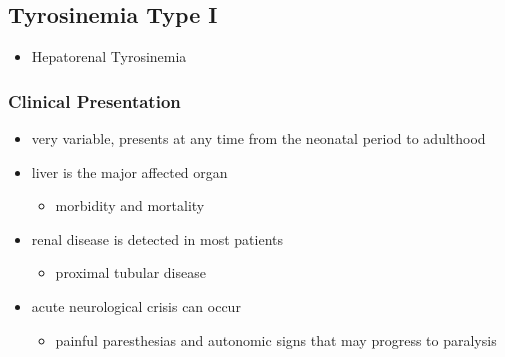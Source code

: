 \documentclass{scrartcl}
\begin{document}
\subsection{Tyrosinemia Type I}
\label{sec:org34dd25d}
\begin{itemize}
\item Hepatorenal Tyrosinemia
\end{itemize}
\subsubsection{Clinical Presentation}
\label{sec:org9fab2a2}
\begin{itemize}
\item very variable, presents at any time from the neonatal period to adulthood

\item liver is the major affected organ
\begin{itemize}
\item morbidity and mortality
\end{itemize}
\item renal disease is detected in most patients
\begin{itemize}
\item proximal tubular disease
\end{itemize}
\item acute neurological crisis can occur
\begin{itemize}
\item painful paresthesias and autonomic signs that may progress to
paralysis
\end{itemize}
\end{itemize}
\end{document}
